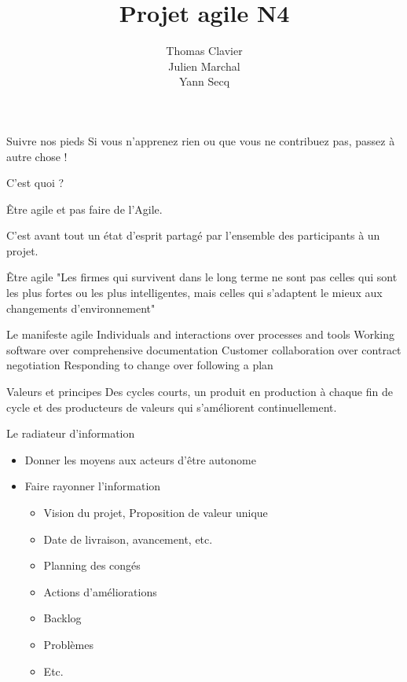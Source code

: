 \documentclass{beamer}
\title{Projet agile N4}
\author{
  Thomas Clavier \\
  Julien Marchal \\
  Yann Secq 
}
\date{}
\begin{document}
\frame{\titlepage}

\begin{frame}{Suivre nos pieds}
  \Large Si vous n’apprenez rien ou que vous ne contribuez pas, passez à autre chose !
\end{frame}

\begin{frame}{C'est quoi ?}
 
  {\Large \alert{Être agile} et pas faire de l'Agile.}

  \vspace{6mm}
  C'est avant tout un état d'esprit partagé par l'ensemble des participants à un projet.
\end{frame}

\begin{frame}{Être agile}
  "Les firmes qui survivent dans le long terme ne sont pas celles qui sont les plus fortes ou les plus intelligentes, mais celles qui s'adaptent le mieux aux changements d'environnement"


\end{frame}

\begin{frame}{Le manifeste agile}
  \large
  \alert{Individuals and interactions} over processes and tools\newline
  \alert{Working software} over comprehensive documentation\newline
  \alert{Customer collaboration} over contract negotiation\newline
  \alert{Responding to change} over following a plan
\end{frame}

\begin{frame}{Valeurs et principes}
  \Large Des cycles courts, un produit en production à chaque fin de cycle et des producteurs de valeurs qui s'améliorent continuellement.
\end{frame}

\begin{frame}{Le radiateur d'information}
  \begin{itemize}
    \item Donner les moyens aux acteurs d'être autonome
    \item Faire rayonner l'information
    
    \begin{itemize}
      \item Vision du projet, Proposition de valeur unique
      \item Date de livraison, avancement, etc.
      \item Planning des congés
      \item Actions d'améliorations
      \item Backlog
      \item Problèmes
      \item Etc.
    \end{itemize}
  \end{itemize}
\end{frame}
\end{document}
